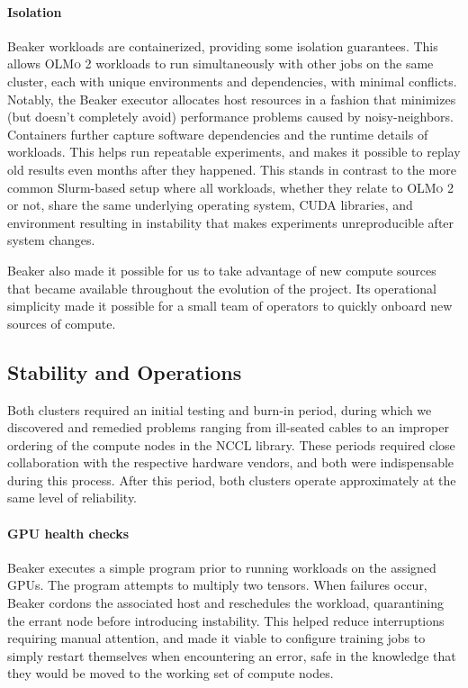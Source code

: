 \documentclass[table]{ai2style/ai2}
\newcommand{\olmotoo}{\textsc{OLMo 2}\xspace}
\begin{document}
\paragraph{Isolation} Beaker workloads are containerized, providing some isolation guarantees. 
This allows \olmotoo workloads to run simultaneously with other jobs on the same cluster, each with unique environments and dependencies, with minimal conflicts. Notably, the Beaker executor allocates host resources in a fashion that minimizes (but doesn't completely avoid) performance problems caused by noisy-neighbors.
Containers further capture software dependencies and the runtime details of workloads. 
This helps run repeatable experiments, and makes it possible to replay old results even months after they happened. 
This stands in contrast to the more common Slurm-based setup where all workloads, whether they relate to \olmotoo or not, share the same underlying operating system, CUDA libraries, and environment resulting in instability that makes experiments unreproducible after system changes.

Beaker also made it possible for us to take advantage of new compute sources that became available throughout the evolution of the project. 
Its operational simplicity made it possible for a small team of operators to quickly onboard new sources of compute.

\subsection{Stability and Operations}

Both clusters required an initial testing and burn-in period, during which we discovered and remedied problems ranging from ill-seated cables to an improper ordering of the compute nodes in the NCCL library.
These periods required close collaboration with the respective hardware vendors, and both were indispensable during this process.
After this period, both clusters operate approximately at the same level of reliability.

\paragraph{GPU health checks} Beaker executes a simple program prior to running workloads on the assigned GPUs. The program attempts to multiply two tensors. When failures occur, Beaker cordons the associated host and reschedules the workload, quarantining the errant node before introducing instability. This helped reduce interruptions requiring manual attention, and made it viable to configure training jobs to simply restart themselves when encountering an error, safe in the knowledge that they would be moved to the working set of compute nodes.
\end{document}
